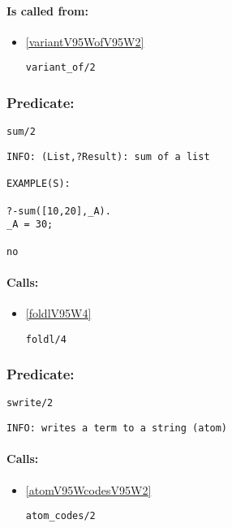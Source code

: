 \paragraph{Is called from:} 
\begin{itemize}
\item \ref{variantV95WofV95W2} 
\begin{verbatim}
variant_of/2
\end{verbatim}

\end{itemize}

\subsubsection{Predicate:} \label{sumV95W2}

\begin{verbatim}
sum/2
\end{verbatim}

{\small \begin{verbatim}
INFO: (List,?Result): sum of a list

EXAMPLE(S):

?-sum([10,20],_A).
_A = 30;

no

\end{verbatim}}
\paragraph{Calls:} 
\begin{itemize}
\item \ref{foldlV95W4} 
\begin{verbatim}
foldl/4
\end{verbatim}

\end{itemize}

\subsubsection{Predicate:} \label{swriteV95W2}

\begin{verbatim}
swrite/2
\end{verbatim}

{\small \begin{verbatim}
INFO: writes a term to a string (atom)

\end{verbatim}}
\paragraph{Calls:} 
\begin{itemize}
\item \ref{atomV95WcodesV95W2} 
\begin{verbatim}
atom_codes/2
\end{verbatim}

\end{itemize}

